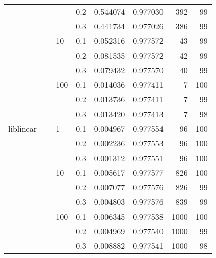 \begin{table}[H]
\begin{tabular}{llllrrrr}
          &   &     & 0.2 &  0.544074 &  0.977030 &     392 &    99 \\
          &   &     & 0.3 &  0.441734 &  0.977026 &     386 &    99 \\
          &   & 10  & 0.1 &  0.052316 &  0.977572 &      43 &    99 \\
          &   &     & 0.2 &  0.081535 &  0.977572 &      42 &    99 \\
          &   &     & 0.3 &  0.079432 &  0.977570 &      40 &    99 \\
          &   & 100 & 0.1 &  0.014036 &  0.977411 &       7 &   100 \\
          &   &     & 0.2 &  0.013736 &  0.977411 &       7 &    99 \\
          &   &     & 0.3 &  0.013420 &  0.977413 &       7 &    98 \\
liblinear & - & 1   & 0.1 &  0.004967 &  0.977554 &      96 &   100 \\
          &   &     & 0.2 &  0.002236 &  0.977553 &      96 &   100 \\
          &   &     & 0.3 &  0.001312 &  0.977551 &      96 &   100 \\
          &   & 10  & 0.1 &  0.005617 &  0.977577 &     826 &   100 \\
          &   &     & 0.2 &  0.007077 &  0.977576 &     826 &    99 \\
          &   &     & 0.3 &  0.004803 &  0.977576 &     839 &    99 \\
          &   & 100 & 0.1 &  0.006345 &  0.977538 &    1000 &   100 \\
          &   &     & 0.2 &  0.004969 &  0.977540 &    1000 &    99 \\
          &   &     & 0.3 &  0.008882 &  0.977541 &    1000 &    98 \\
\bottomrule
\end{tabular}
\end{table}
